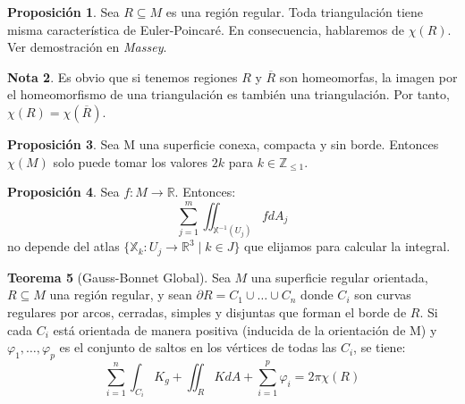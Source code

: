 \documentclass[twoside]{report}
\theoremstyle{definition}
\newtheorem{theorem}{Teorema}[section]
\newtheorem{nota}[theorem]{Nota}
\newtheorem{prop}[theorem]{Proposición}
\numberwithin{equation}{section}
\newcommand{\Z}{\mathbb{Z}}
\newcommand{\R}{\mathbb{R}}
\newcommand{\X}{\mathbb{X}}
\begin{document}
\begin{prop} Sea $R \subseteq M$ es una región regular. Toda triangulación tiene misma característica de Euler-Poincaré. En consecuencia, hablaremos de $χ(R)$. Ver demostración en \textit{Massey}.
\end{prop}
\begin{nota} Es obvio que si tenemos regiones $R$ y $\overline{R}$ son homeomorfas, la imagen por el homeomorfismo de una triangulación es también una triangulación. Por tanto, $\chi(R) = \chi(\overline{R})$.
\end{nota}
\begin{prop} Sea M una superficie conexa, compacta y sin borde. Entonces $\chi(M)$ solo puede tomar los valores $2k$ para $k\in\Z_{\leq 1}$.
\end{prop}
\begin{prop} Sea $f:M\rightarrow \R$. Entonces:
\[
\sum_{j=1}^m \iint_{\X^{-1}(U_j)} f dA_j
\]
no depende del atlas $\{\X_k : U_j \rightarrow \R^3\mid k\in J\}$ que elijamos para calcular la integral.
\end{prop}
\begin{theorem}[Gauss-Bonnet Global]\label{global} Sea  $M$ una superficie regular orientada, $R \subseteq M$ una región regular, y sean $\partial R= C_1\cup \dotsc \cup C_n$ donde $C_i$ son curvas regulares por arcos, cerradas, simples y disjuntas que forman el borde de $R$. Si cada $C_i$ está orientada de manera positiva (inducida de la orientación de M) y $\varphi_1,\dotsc,\varphi_p$ es el conjunto de saltos en los vértices de todas las $C_i$, se tiene:
\[
\sum_{i=1}^n \int_{C_i}K_g + \iint_R KdA + \sum_{i=1}^p \varphi_i = 2\pi \chi(R)
\]
\end{theorem}
\end{document}
